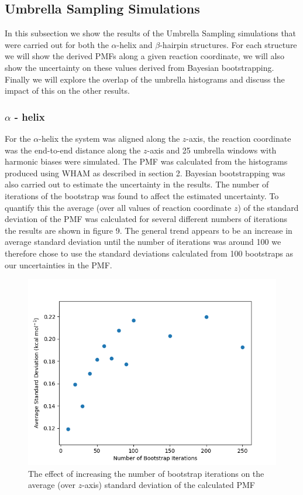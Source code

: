 \documentclass[12pt, onecolumn]{revtex4}    %
\begin{document}
\subsection{Umbrella Sampling Simulations}  

In this subsection we show the results of the Umbrella Sampling simulations that were carried out for both the $\alpha$-helix and $\beta$-hairpin structures.  For each structure we will show the derived PMFs \cite{GWHAM} along a given reaction coordinate, we will also show the uncertainty on these values derived from Bayesian bootstrapping\cite{GWHAM}.  Finally we will explore the overlap of the umbrella histograms and discuss the impact of this on the other results. 

\subsubsection{$\alpha$ - helix}

For the $\alpha$-helix the system was aligned along the $z$-axis, the reaction coordinate was the end-to-end distance along the $z$-axis and 25 umbrella windows with harmonic biases were simulated.  The PMF was calculated from the histograms produced using WHAM as described in section 2.  Bayesian bootstrapping was also carried out to estimate the uncertainty in the results.  The number of iterations of the bootstrap was found to affect the estimated uncertainty.  To quantify this the average (over all values of reaction coordinate $z$) of the standard deviation of the PMF was calculated for several different numbers of iterations the results are shown in figure 9.  The general trend appears to be an increase in average standard deviation until the number of iterations was around 100 we therefore chose to use the standard deviations calculated from 100 bootstraps as our uncertainties in the PMF.\\ 

\begin{figure}[h!]
\label{fig: helboot}
\includegraphics[scale=0.5]{HelBootstrapSDev}
\caption{The effect of increasing the number of bootstrap iterations on the average (over $z$-axis) standard deviation of the calculated PMF}
\end{figure}
\end{document}
